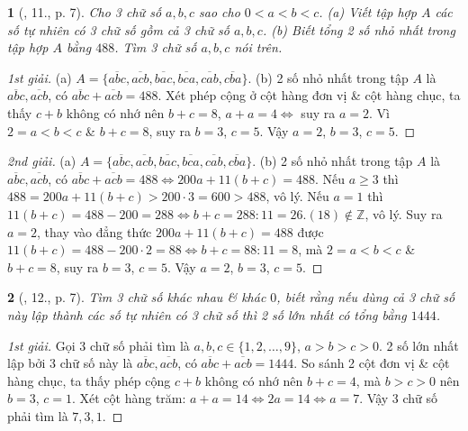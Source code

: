 \documentclass{article}
\newtheorem{baitoan}{}
\begin{document}
\begin{baitoan}[\cite{Binh_Toan_6_tap_1}, 11., p. 7]
	Cho 3 chữ số $a,b,c$ sao cho $0 < a < b < c$. (a) Viết tập hợp $A$ các số tự nhiên có 3 chữ số gồm cả 3 chữ số $a,b,c$. (b) Biết tổng 2 số nhỏ nhất trong tập hợp $A$ bằng $488$. Tìm 3 chữ số $a,b,c$ nói trên.
\end{baitoan}

\begin{proof}[1st giải]
	(a) $A = \{\overline{abc},\overline{acb},\overline{bac},\overline{bca},\overline{cab},\overline{cba}\}$. (b) 2 số nhỏ nhất trong tập $A$ là $\overline{abc},\overline{acb}$, có $\overline{abc} + \overline{acb} = 488$. Xét phép cộng ở cột hàng đơn vị \& cột hàng chục, ta thấy $c + b$ không có nhớ nên $b + c = 8$, $a + a = 4\Leftrightarrow$ suy ra $a = 2$. Vì $2 = a < b < c$ \& $b + c = 8$, suy ra $b = 3$, $c = 5$. Vậy $a = 2$, $b = 3$, $c = 5$.
\end{proof}

\begin{proof}[2nd giải]
	(a) $A = \{\overline{abc},\overline{acb},\overline{bac},\overline{bca},\overline{cab},\overline{cba}\}$. (b) 2 số nhỏ nhất trong tập $A$ là $\overline{abc},\overline{acb}$, có $\overline{abc} + \overline{acb} = 488\Leftrightarrow200a + 11(b + c) = 488$. Nếu $a\ge3$ thì $488 = 200a + 11(b + c) > 200\cdot3 = 600 > 488$, vô lý. Nếu $a = 1$ thì $11(b + c) = 488 - 200 = 288\Leftrightarrow b + c = 288:11 = 26.(18)\notin\mathbb{Z}$, vô lý. Suy ra $a = 2$, thay vào đẳng thức $200a + 11(b + c) = 488$ được $11(b + c) = 488 - 200\cdot2 = 88\Leftrightarrow b + c = 88:11 = 8$, mà $2 = a < b < c$ \& $b + c = 8$, suy ra $b = 3$, $c = 5$. Vậy $a = 2$, $b = 3$, $c = 5$.
\end{proof}

\begin{baitoan}[\cite{Binh_Toan_6_tap_1}, 12., p. 7]
	Tìm 3 chữ số khác nhau \& khác $0$, biết rằng nếu dùng cả 3 chữ số này lập thành các số tự nhiên có 3 chữ số thì 2 số lớn nhất có tổng bằng $1444$.
\end{baitoan}

\begin{proof}[1st giải]
	Gọi 3 chữ số phải tìm là $a,b,c\in\{1,2,\ldots,9\}$, $a > b > c > 0$. 2 số lớn nhất lập bởi 3 chữ số này là $\overline{abc},\overline{acb}$, có $\overline{abc} + \overline{acb} = 1444$. So sánh 2 cột đơn vị \& cột hàng chục, ta thấy phép cộng $c + b$ không có nhớ nên $b + c = 4$, mà $b > c > 0$ nên $b = 3$, $c = 1$. Xét cột hàng trăm: $a + a  = 14\Leftrightarrow2a = 14\Leftrightarrow a = 7$. Vậy 3 chữ số phải tìm là $7,3,1$.
\end{proof}
\end{document}
